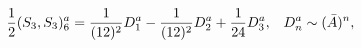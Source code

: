 \begin{equation*}
\frac{1}{2}(S_{3},S_{3})_{6}^{a}=\frac{1}{(12)^{2}}D_{1}^{a}-\frac{1}{%
(12)^{2}}D_{2}^{a}+\frac{1}{24}D_{3}^{a},\;\;\;D_{n}^{a}\sim (\bar{A})^{n},
\end{equation*}

